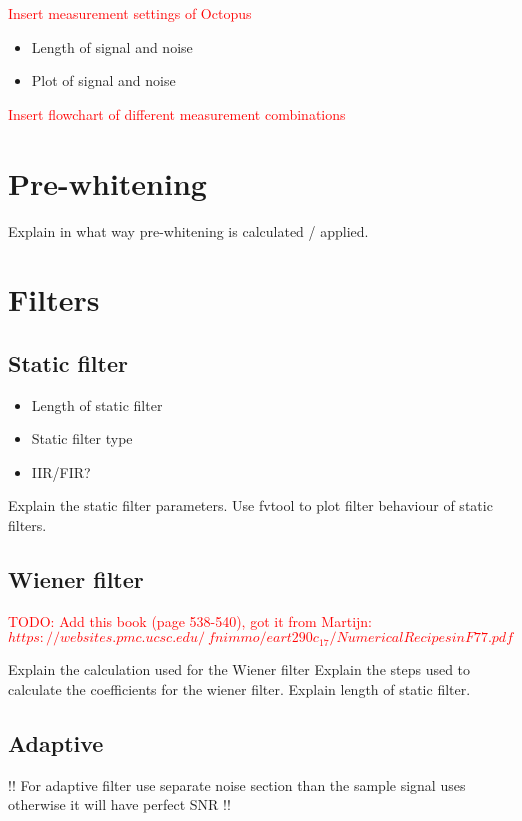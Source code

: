 \textcolor{red}{Insert measurement settings of Octopus}

\begin{itemize}
    \item Length of signal and noise
    \item Plot of signal and noise
\end{itemize}

\textcolor{red}{Insert flowchart of different measurement combinations}

\section{Pre-whitening}
Explain in what way pre-whitening is calculated / applied.
\section{Filters}
\subsection{Static filter}

\begin{itemize}
    \item Length of static filter
    \item Static filter type
    \item IIR/FIR? 
\end{itemize}

Explain the static filter parameters. Use fvtool to plot filter behaviour of static filters.


\subsection{Wiener filter}


\textcolor{red}{TODO: Add this book (page 538-540), got it from Martijn:
$https://websites.pmc.ucsc.edu/~fnimmo/eart290c_17/NumericalRecipesinF77.pdf$}

Explain the calculation used for the Wiener filter
Explain the steps used to calculate the coefficients for the wiener filter. Explain length of static filter. 

\subsection{Adaptive}

!! For adaptive filter use separate noise section than the sample signal uses otherwise it will have perfect SNR !!


